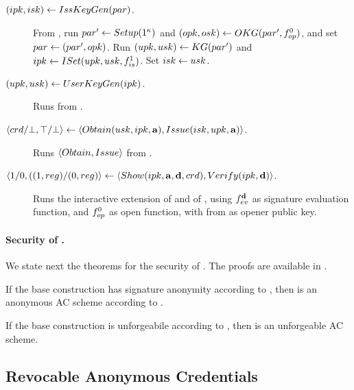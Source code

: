 \begin{description}
\item[$(ipk,isk) \gets IssKeyGen(par)$.] From \CUASGen, run $par' \gets
  Setup(1^\kappa)$ and $(opk,osk) \gets OKG(par',
  f_{op}^0)$, and set $par \gets (par',opk)$. Run $(upk,usk) \gets
  KG(par')$ and $ipk \gets ISet(upk,usk,f_{is}^1)$. Set $isk \gets
  usk$.
\item[$(upk,usk) \gets UserKeyGen(ipk)$.] Runs \KeyGen from \CUASGen.
\item[$\langle crd/\bot,\top/\bot \rangle \gets
  \langle Obtain(usk,ipk,\mathbf{a}),Issue(isk,upk,\mathbf{a}) \rangle$.]
  Runs $\langle Obtain,Issue \rangle$ from \CUASGen.
\item[$\langle 1/0,((1,reg)/(0,reg)\rangle
  \gets \langle Show(ipk,\mathbf{a},\mathbf{d},
  crd),Verify(ipk,\mathbf{d}) \rangle$.]
  Runs the interactive extension of \Sign and \Verify of \CUASGen, using
  $f_{ev}^{\mathbf{d}}$ as signature evaluation function, and $f_{op}^0$ as open
  function, with \opk from \parm as opener public key.
\end{description}

\paragraph{Security of \CUASAC.} %
We state next the theorems for the security of \CUASAC. The proofs are
available in .

\begin{theorem}
  \label{thm:anon-cuasac}
  If the base \CUASGen construction has signature anonymity according to
  , then \CUASAC is an anonymous AC scheme
  according to \cite{fhs19}.
\end{theorem}

\begin{theorem}
  \label{thm:forge-cuasac}
  If the base \CUASGen construction is unforgeabile according to
  , then \CUASAC is an unforgeable AC scheme.
\end{theorem}

\subsection{Revocable Anonymous Credentials}
\label{sapp:related-models-rac}

